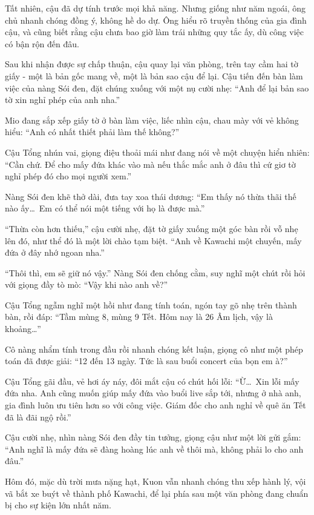 \documentclass[../main.tex]{subfiles}
\begin{document}
Tất nhiên, cậu đã dự tính trước mọi khả năng. Nhưng giống như năm ngoái, ông chủ nhanh chóng đồng ý, không hề do dự. Ông hiểu rõ truyền thống của gia đình cậu, và cũng biết rằng cậu chưa bao giờ làm trái những quy tắc ấy, dù công việc có bận rộn đến đâu.

Sau khi nhận được sự chấp thuận, cậu quay lại văn phòng, trên tay cầm hai tờ giấy - một là bản gốc mang về, một là bản sao cậu để lại. Cậu tiến đến bàn làm việc của nàng Sói đen, đặt chúng xuống với một nụ cười nhẹ: ``Anh để lại bản sao tờ xin nghỉ phép của anh nha.''

Mio đang sắp xếp giấy tờ ở bàn làm việc, liếc nhìn cậu, chau mày với vẻ không hiểu: ``Anh có nhất thiết phải làm thế không?''

Cậu Tổng nhún vai, giọng điệu thoải mái như đang nói về một chuyện hiển nhiên: ``Cần chứ. Để cho mấy đứa khác vào mà nếu thắc mắc anh ở đâu thì cứ giơ tờ nghỉ phép đó cho mọi người xem.''

Nàng Sói đen khẽ thở dài, đưa tay xoa thái dương: ``Em thấy nó thừa thãi thế nào ấy\dots\ Em có thể nói một tiếng với họ là được mà.''

``Thừa còn hơn thiếu,'' cậu cười nhẹ, đặt tờ giấy xuống một góc bàn rồi vỗ nhẹ lên đó, như thể đó là một lời chào tạm biệt. ``Anh về Kawachi một chuyến, mấy đứa ở đây nhớ ngoan nha.''

``Thôi thì, em sẽ giữ nó vậy.'' Nàng Sói đen chống cằm, suy nghĩ một chút rồi hỏi với giọng đầy tò mò: ``Vậy khi nào anh về?''

Cậu Tổng ngẫm nghĩ một hồi như đang tính toán, ngón tay gõ nhẹ trên thành bàn, rồi đáp: ``Tầm mùng 8, mùng 9 Tết. Hôm nay là 26 Âm lịch, vậy là khoảng\dots''

Cô nàng nhẩm tính trong đầu rồi nhanh chóng kết luận, giọng cô như một phép toán đã được giải: ``12 đến 13 ngày. Tức là sau buổi concert của bọn em à?''

Cậu Tổng gãi đầu, vẻ hơi áy náy, đôi mắt cậu có chút hối lỗi: ``Ừ\dots\ Xin lỗi mấy đứa nha. Anh cũng muốn giúp mấy đứa vào buổi live sắp tới, nhưng ở nhà anh, gia đình luôn ưu tiên hơn so với công việc. Giám đốc cho anh nghỉ về quê ăn Tết đã là đãi ngộ rồi.''

Cậu cười nhẹ, nhìn nàng Sói đen đầy tin tưởng, giọng cậu như một lời gửi gắm: ``Anh nghĩ là mấy đứa sẽ đàng hoàng lúc anh về thôi mà, không phải lo cho anh đâu.''

Hôm đó, mặc dù trời mưa nặng hạt, Kuon vẫn nhanh chóng thu xếp hành lý, vội vã bắt xe buýt về thành phố Kawachi, để lại phía sau một văn phòng đang chuẩn bị cho sự kiện lớn nhất năm.
\end{document}
